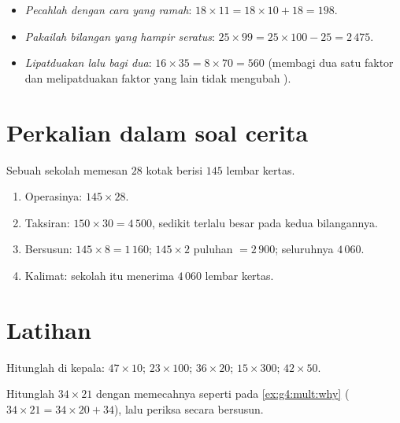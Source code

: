 \begin{example}\label{ex:g4:mult:tricks}
\begin{itemize}
  \item \emph{Pecahlah dengan cara yang ramah}: $18 \times 11 = 18 \times 10
        + 18 = 198$.
  \item \emph{Pakailah bilangan yang hampir seratus}: $25 \times 99 = 25 \times 100 -
        25 = 2\,475$.
  \item \emph{Lipatduakan lalu bagi dua}: $16 \times 35 = 8 \times 70 =
        560$ (membagi dua satu faktor dan melipatduakan faktor yang
        lain tidak mengubah ).
\end{itemize}
\end{example}

\section{Perkalian dalam soal cerita}

\begin{example}\label{ex:g4:mult:problem}
Sebuah sekolah memesan $28$ kotak berisi $145$ lembar kertas.
\begin{enumerate}
  \item Operasinya: $145 \times 28$.
  \item Taksiran: $150 \times 30 = 4\,500$, sedikit terlalu besar
        pada kedua bilangannya.
  \item Bersusun: $145 \times 8 = 1\,160$; $145 \times 2$ puluhan
        $= 2\,900$; seluruhnya $4\,060$.
  \item Kalimat: sekolah itu menerima $4\,060$ lembar kertas.
\end{enumerate}
\end{example}

\section{Latihan}

\begin{exercise}[$\star$]\label{exo:g4:mult:1}
Hitunglah di kepala: $47 \times 10$; \quad $23 \times 100$; \quad
$36 \times 20$; \quad $15 \times 300$; \quad $42 \times 50$.
\end{exercise}

\begin{exercise}[$\star$]\label{exo:g4:mult:2}
Hitunglah $34 \times 21$ dengan memecahnya seperti pada \cref{ex:g4:mult:why}
($34 \times 21 = 34 \times 20 + 34$), lalu periksa secara bersusun.
\end{exercise}

